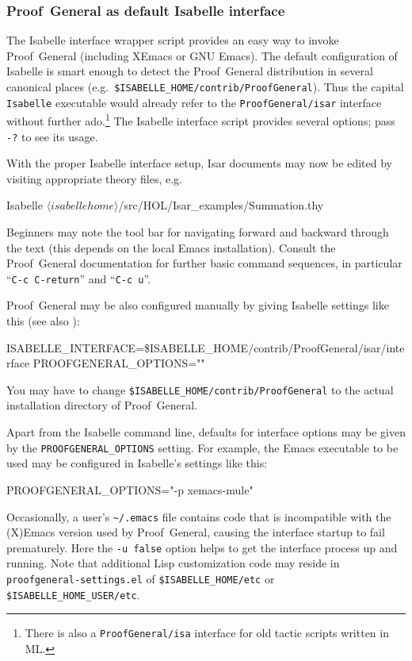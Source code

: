 \subsubsection{Proof~General as default Isabelle interface}

The Isabelle interface wrapper script provides an easy way to invoke
Proof~General (including XEmacs or GNU Emacs).  The default configuration of
Isabelle is smart enough to detect the Proof~General distribution in several
canonical places (e.g.\ \texttt{\$ISABELLE_HOME/contrib/ProofGeneral}).  Thus
the capital \texttt{Isabelle} executable would already refer to the
\texttt{ProofGeneral/isar} interface without further ado.\footnote{There is
  also a \texttt{ProofGeneral/isa} interface for old tactic scripts written in
  ML.} The Isabelle interface script provides several options; pass \verb,-?,
to see its usage.

With the proper Isabelle interface setup, Isar documents may now be edited by
visiting appropriate theory files, e.g.\ 
\begin{ttbox}
Isabelle \({\langle}isabellehome{\rangle}\)/src/HOL/Isar_examples/Summation.thy
\end{ttbox}
Beginners may note the tool bar for navigating forward and backward through
the text (this depends on the local Emacs installation).  Consult the
Proof~General documentation \cite{proofgeneral} for further basic command
sequences, in particular ``\texttt{C-c C-return}'' and ``\texttt{C-c u}''.

\medskip

Proof~General may be also configured manually by giving Isabelle settings like
this (see also \cite{isabelle-sys}):
\begin{ttbox}
ISABELLE_INTERFACE=\$ISABELLE_HOME/contrib/ProofGeneral/isar/interface
PROOFGENERAL_OPTIONS=""
\end{ttbox}
You may have to change \texttt{\$ISABELLE_HOME/contrib/ProofGeneral} to the
actual installation directory of Proof~General.

\medskip

Apart from the Isabelle command line, defaults for interface options may be
given by the \texttt{PROOFGENERAL_OPTIONS} setting.  For example, the Emacs
executable to be used may be configured in Isabelle's settings like this:
\begin{ttbox}
PROOFGENERAL_OPTIONS="-p xemacs-mule"  
\end{ttbox}

Occasionally, a user's \verb,~/.emacs, file contains code that is incompatible
with the (X)Emacs version used by Proof~General, causing the interface startup
to fail prematurely.  Here the \texttt{-u false} option helps to get the
interface process up and running.  Note that additional Lisp customization
code may reside in \texttt{proofgeneral-settings.el} of
\texttt{\$ISABELLE_HOME/etc} or \texttt{\$ISABELLE_HOME_USER/etc}.


